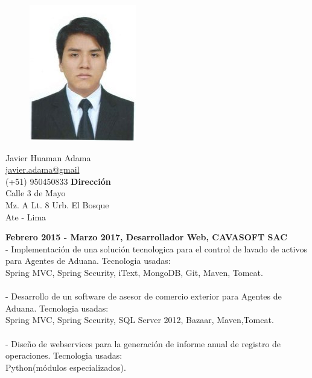 \documentclass[a4paper,12pt,final]{memoir}
\newcommand{\Sep}{\vspace{1.5em}}
\newcommand{\SmallSep}{\vspace{0.5em}}
\newcommand{\CVItem}[1]
	{\textbf{\color{RoyalBlue} #1}}
\begin{document}
\begin{figure}
	\hfill
	\includegraphics[width=0.6\columnwidth]{profile}
	\vspace{-7cm}
\end{figure}

\begin{flushright}\small
	Javier Huaman Adama \\
	\url{javier.adama@gmail}  \\
	(+51) 950450833
	\Sep
	\textbf{Dirección} \\
	Calle 3 de Mayo \\ %
	Mz. A Lt. 8 Urb. El Bosque \\ %
	Ate - Lima \\ %
\end{flushright}\normalsize
\framebreak

\CVItem{Febrero 2015 - Marzo 2017, Desarrollador Web, CAVASOFT SAC}\\
- Implementación de una solución tecnologica para el control de lavado de activos para Agentes de Aduana. Tecnologia usadas:\\
Spring MVC, Spring Security, iText, MongoDB, Git, Maven, Tomcat.\\\\
- Desarrollo de un software de asesor de comercio exterior para Agentes de Aduana. Tecnologia usadas:\\
Spring MVC, Spring Security, SQL Server 2012, Bazaar, Maven,Tomcat.\\\\
- Diseño de webservices para la generación de informe anual de registro de operaciones. Tecnologia usadas:\\
Python(módulos especializados).
\SmallSep
\end{document}
